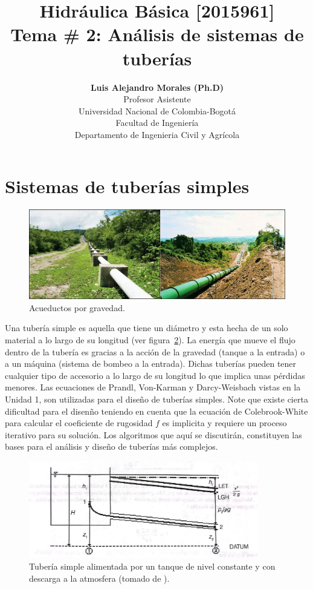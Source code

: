 \documentclass[11pt, oneside]{article}
\title{Hidr\'aulica B\'asica [2015961] \\ \textbf{Tema \# 2: An\'alisis de sistemas de tuber\'ias}}
\author{\textbf{Luis Alejandro Morales (Ph.D)}\\ \vspace{0.4cm} Profesor Asistente \\ Universidad Nacional de Colombia-Bogot\'a\\Facultad de Ingenier\'ia \\ Departamento de Ingenieria Civil y Agr\'icola}
\date{}
\begin{document}
\maketitle
\tableofcontents


\section{Sistemas de tuber\'ias simples} \label{tubs}

\begin{figure}[h]
\centering
\includegraphics[width=12cm]{./figs/simpTub.png}
\caption{Acueductos por gravedad.} 
\label{simpTub}
\end{figure}


Una tuber\'ia simple es aquella que tiene un di\'ametro y esta hecha de un solo material a lo largo de su longitud (ver figura~\ref{ttub}). La energ\'ia que mueve el flujo dentro de la tuber\'ia es gracias a la acci\'on de la gravedad (tanque a la entrada) o a un m\'aquina (sistema de bombeo a la entrada). Dichas tuber\'ias pueden tener cualquier tipo de accesorio a lo largo de su longitud lo que implica unas p\'erdidas menores. Las ecuaciones de Prandl, Von-Karman y Darcy-Weisbach vistas en la Unidad 1, son utilizadas para el dise\~no de tuber\'ias simples. Note que existe cierta dificultad para el disen\~no teniendo en cuenta que la ecuaci\'on de Colebrook-White para calcular el coeficiente de rugosidad $f$ es implicita y requiere un proceso iterativo para su soluci\'on. Los algoritmos que aqu\'i se discutir\'an, constituyen las bases para el an\'alisis y dise\~no de tuber\'ias m\'as complejos. 

\begin{figure}[h]
\centering
\includegraphics[width=10cm]{./figs/ttub.jpeg}
\caption{Tuber\'ia simple alimentada por un tanque de nivel constante y con descarga a la atmosfera (tomado de \cite{saldarriaga}).} 
\label{ttub}
\end{figure}
\end{document}
